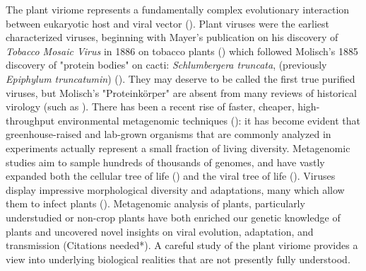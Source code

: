 \documentclass[11pt,letterpaper,titlepage]{article}
\begin{document}
\begin{linenumbers}
The plant viriome represents a fundamentally complex evolutionary interaction between eukaryotic host and viral vector (\cite{delwart_viral_2007}). 
Plant viruses were the earliest characterized viruses, beginning with Mayer's publication on his discovery of \textit{Tobacco Mosaic Virus} in 1886 on tobacco plants (\cite{mayer1886mosaikkrankheit}) which followed Molisch's 1885 discovery of "protein bodies" on cacti: \textit{Schlumbergera truncata}, (previously \textit{Epiphylum truncatumin}) (\cite{molisch1885merkwurdige}). 
They may deserve to be called the first true purified viruses, but Molisch's "Proteinkörper" are absent from many reviews of historical virology (such as \cite{LECOQ2001929, lefeuvre_evolution_2019}).
There has been a recent rise of faster, cheaper, high-throughput environmental metagenomic techniques (\cite{delwart_viral_2007, lefeuvre_evolution_2019, schulz_towards_2017}): it has become evident that greenhouse-raised and lab-grown organisms that are commonly analyzed in experiments actually represent a small fraction of living diversity.  
Metagenomic studies aim to sample hundreds of thousands of genomes, and have vastly expanded both the cellular tree of life (\cite{schulz_towards_2017, hug_new_2016}) and the viral tree of life (\cite{gregory_marine_2019, lefeuvre_evolution_2019, shi_redefining_2016}).  
Viruses display impressive morphological diversity and adaptations, many which allow them to infect plants (\cite{delwart_viral_2007, lefeuvre_evolution_2019}).
 Metagenomic analysis of plants, particularly understudied or non-crop plants have both enriched our genetic knowledge of plants and uncovered novel insights on viral evolution, adaptation, and transmission (Citations needed*). 
 A careful study of the plant viriome provides a view into underlying biological realities that are not presently fully understood.


\end{linenumbers}
\end{document}
